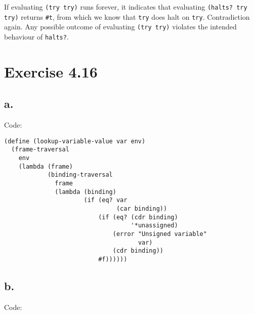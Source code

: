 \documentclass[../main.tex]{subfiles}
\begin{document}
If evaluating \lstinline{(try try)} runs forever, it indicates that
evaluating \lstinline{(halts? try try)} returns \lstinline{#t}, from
which we know that \lstinline{try} does halt on \lstinline{try}.
Contradiction again. Any possible outcome of evaluating
\lstinline{(try try)} violates the intended behaviour of
\lstinline{halts?}.

\section{Exercise 4.16}

\subsection{a.}

Code:

\begin{lstlisting}
(define (lookup-variable-value var env)
  (frame-traversal
    env
    (lambda (frame)
            (binding-traversal
              frame
              (lambda (binding)
                      (if (eq? var
                               (car binding))
                          (if (eq? (cdr binding)
                                   '*unassigned)
                              (error "Unsigned variable"
                                     var)
                              (cdr binding))
                          #f))))))
\end{lstlisting}

\subsection{b.}

Code:
\end{document}
